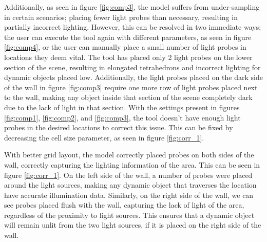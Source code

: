 Additionally, as seen in figure \ref{fig:comp3}, the model suffers from under-sampling in certain scenarios; placing fewer light probes than necessary, resulting in partially incorrect lighting. However, this can be resolved in two immediate ways; the user can execute the tool again with different parameters, as seen in figure \ref{fig:comp4}, or the user can manually place a small number of light probes in locations they deem vital. The tool has placed only 2 light probes on the lower section of the scene, resulting in elongated tetrahedrons and incorrect lighting for dynamic objects placed low. Additionally, the light probes placed on the dark side of the wall in figure \ref{fig:comp3} require one more row of light probes placed next to the wall, making any object inside that section of the scene completely dark due to the lack of light in that section. With the settings present in figures \ref{fig:comp1}, \ref{fig:comp2}, and \ref{fig:comp3}, the tool doesn't have enough light probes in the desired locations to correct this issue. This can be fixed by decreasing the cell size parameter, as seen in figure \ref{fig:corr_1}.

With better grid layout, the model correctly placed probes on both sides of the wall, correctly capturing the lighting information of the area. This can be seen in figure \ref{fig:corr_1}. On the left side of the wall, a number of probes were placed around the light sources, making any dynamic object that traverses the location have accurate illumination data. Similarly, on the right side of the wall, we can see probes placed flush with the wall, capturing the lack of light of the area, regardless of the proximity to light sources. This ensures that a dynamic object will remain unlit from the two light sources, if it is placed on the right side of the wall. 

